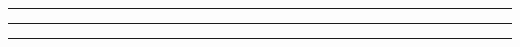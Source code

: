 

\usebox{\topbox}

\vspace{6pt}
\hrule height1pt
\begin{minipage}[t]{21pc}
\vspace*{6pt}
\begin{minipage}[t]{21pc}
  \vspace*{6pt}
  \begin{center}
    \usebox{\statbox}
    \usebox{\personalitybox}
    \usebox{\reputationbox}
  \end{center}
  \hfill
\end{minipage}

  \hrule height1pt
  \vspace{6pt}

\begin{minipage}[t]{21pc}
  \begin{center}
    \usebox{\vfbox}
  \end{center}
  \hfill
\end{minipage}
\end{minipage}
\vrule width 1pt\hfill
\begin{minipage}[t]{21pc}
\vspace*{6pt}\hfill
\begin{center}\usebox{\abilitybox}\end{center}\vfill

\vspace*{6pt}
\end{minipage}
\hrule height1pt
\flushright\CopyRight

\newpage


